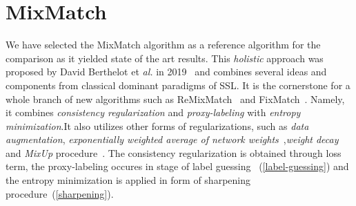 \section{MixMatch}
\label{sec:mix-match}
We have selected the MixMatch algorithm as a reference algorithm for the comparison as it yielded state of the art results. This \textit{holistic} approach
was proposed by David Berthelot et \textit{al.} in 2019~\cite{mixmatch-2019} and combines several ideas and components from classical dominant paradigms of SSL.
It is the cornerstone for a whole branch of new algorithms such as ReMixMatch~\cite{remixmatch-2020} and FixMatch~\cite{fixmatch-2020}. Namely, it combines 
\textit{consistency regularization} and \textit{proxy-labeling} with \textit{entropy minimization}.It also utilizes other forms of regularizations, such as
\textit{data augmentation}, \textit{exponentially weighted average of network weights}~\cite{mean-teacher-2018},\textit{weight decay}~\cite{weight-decay-2019} and 
\textit{MixUp} procedure~\cite{mixup-2018}. The consistency regularization is obtained through loss term, the proxy-labeling occures in stage of label 
guessing ~(\ref{label-guessing}) and the entropy minimization is applied in form of sharpening procedure~(\ref{sharpening}).

